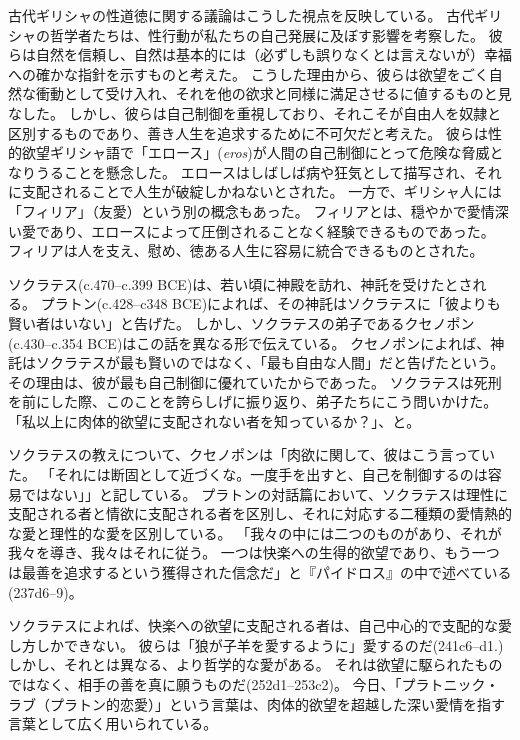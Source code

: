 \documentclass[paper=a4,book,openany]{jlreq} \usepackage{mystyle}
\begin{document}
古代ギリシャの性道徳に関する議論はこうした視点を反映している。
古代ギリシャの哲学者たちは、性行動が私たちの自己発展に及ぼす影響を考察した。
彼らは自然を信頼し、自然は基本的には（必ずしも誤りなくとは言えないが）幸福への確かな指針を示すものと考えた。
こうした理由から、彼らは欲望をごく自然な衝動として受け入れ、それを他の欲求と同様に満足させるに値するものと見なした。
しかし、彼らは自己制御を重視しており、それこそが自由人を奴隷と区別するものであり、善き人生を追求するために不可欠だと考えた。
彼らは性的欲望{\DDASH}ギリシャ語で「エロース」(\emph{eros}){\DDASH}が人間の自己制御にとって危険な脅威となりうることを懸念した。
エロースはしばしば病や狂気として描写され、それに支配されることで人生が破綻しかねないとされた。
一方で、ギリシャ人には「フィリア」（友愛）という別の概念もあった。
フィリアとは、穏やかで愛情深い愛であり、エロースによって圧倒されることなく経験できるものであった。
フィリアは人を支え、慰め、徳ある人生に容易に統合できるものとされた。

ソクラテス(c.470--c.399 BCE)は、若い頃に神殿を訪れ、神託を受けたとされる。
プラトン(c.428--c348 BCE)によれば、その神託はソクラテスに「彼よりも賢い者はいない」と告げた。
しかし、ソクラテスの弟子であるクセノポン(c.430--c.354 BCE)はこの話を異なる形で伝えている。
クセノポンによれば、神託はソクラテスが最も賢いのではなく、「最も自由な人間」だと告げたという。
その理由は、彼が最も自己制御に優れていたからであった。
ソクラテスは死刑を前にした際、このことを誇らしげに振り返り、弟子たちにこう問いかけた。
「私以上に肉体的欲望に支配されない者を知っているか？」、と\citep[16]{xenophon13:_apolog_socrat}。

ソクラテスの教えについて、クセノポンは「肉欲に関して、彼はこう言っていた。
「それには断固として近づくな。一度手を出すと、自己を制御するのは容易ではない」」\citep{xenophon13:_memor}と記している。
プラトンの対話篇において、ソクラテスは理性に支配される者と情欲に支配される者を区別し、それに対応する二種類の愛{\DDASH}情熱的な愛と理性的な愛{\DDASH}を区別している。
「我々の中には二つのものがあり、それが我々を導き、我々はそれに従う。
一つは快楽への生得的欲望であり、もう一つは最善を追求するという獲得された信念だ」と『パイドロス』の中で述べている(237d6--9)。

ソクラテスによれば、快楽への欲望に支配される者は、自己中心的で支配的な愛し方しかできない。
彼らは「狼が子羊を愛するように」愛するのだ(241c6--d1.)%
しかし、それとは異なる、より哲学的な愛がある。
それは欲望に駆られたものではなく、相手の善を真に願うものだ(252d1--253c2)。
今日、「プラトニック・ラブ（プラトン的恋愛）」という言葉は、肉体的欲望を超越した深い愛情を指す言葉として広く用いられている。
\end{document}
